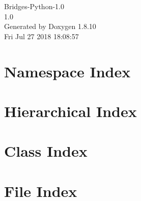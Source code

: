 \documentclass[twoside]{book}
\newcommand{\+}{\discretionary{\mbox{\scriptsize$\hookleftarrow$}}{}{}}
\newcommand{\clearemptydoublepage}{%
  \newpage{\pagestyle{empty}\cleardoublepage}%
}
\begin{document}
\hypersetup{pageanchor=false,
             bookmarks=true,
             bookmarksnumbered=true,
             pdfencoding=unicode
            }
\begin{titlepage}
\vspace*{7cm}
\begin{center}%
{\Large Bridges-\/\+Python-\/1.0 \\[1ex]\large 1.\+0 }\\
\vspace*{1cm}
{\large Generated by Doxygen 1.8.10}\\
\vspace*{0.5cm}
{\small Fri Jul 27 2018 18:08:57}\\
\end{center}
\end{titlepage}
\clearemptydoublepage
\tableofcontents
\clearemptydoublepage
{}
\hypersetup{pageanchor=true}

\chapter{Namespace Index}

\chapter{Hierarchical Index}

\chapter{Class Index}

\chapter{File Index}

\end{document}

